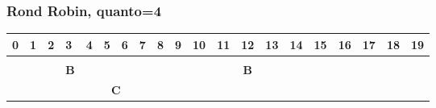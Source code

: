 \documentclass[a4paper]{article}
\begin{document}
\subsubsection{Rond Robin, quanto=4}
\begin{table}[htb]
   \centering
   \label{my-label}
   \begin{tabular}{|l|l|l|l|l|l|l|l|l|l|l|l|l|l|l|l|l|l|l|l|}
      \hline
      0                                                        & 1 & 2 & 3                                                       & 4                                                       & 5 & 6                                                      & 7 & 8                                                       & 9 & 10                                                      & 11 & 12 & 13                                                     & 14 & 15                                             & 16 & 17                                                     & 18 & 19 \\ \hline
      \rowcolor[HTML]{FFFFFF}
      \multicolumn{3}{|c|}{\cellcolor[HTML]{656565}\textbf{A}} &   &   &                                                         &                                                         &   &                                                        &   &                                                         &   &                                                         &    &    &                                                        &    &                                                &    &                                                                  \\ \hline
      \rowcolor[HTML]{FFFFFF}
                                                               &   &   & \multicolumn{1}{c|}{\cellcolor[HTML]{656565}\textbf{B}} &                                                         &   &                                                        &   &                                                         &   & \multicolumn{5}{c|}{\cellcolor[HTML]{656565}\textbf{B}} &    &    &                                                        &    &                                                                                                                        \\ \hline
      \rowcolor[HTML]{FFFFFF}
                                                               &   &   &                                                         & \multicolumn{4}{c|}{\cellcolor[HTML]{656565}\textbf{C}} &   & \multicolumn{1}{c|}{\cellcolor[HTML]{FFFFFF}\textbf{}} &   & \multicolumn{1}{c|}{\cellcolor[HTML]{FFFFFF}\textbf{}}  &   &                                                         &    &    &                                                        &    &                                                &                                                                       \\ \hline

\end{tabular}
\end{table}
\end{document}
